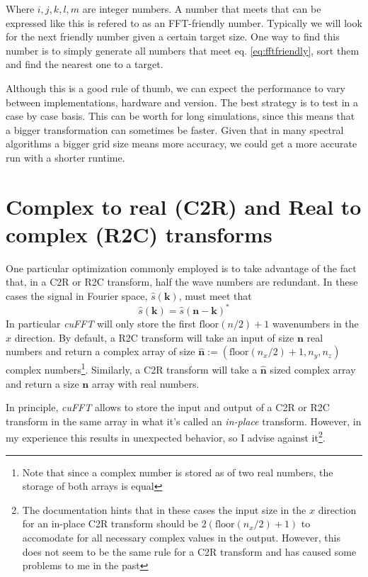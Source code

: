 \documentclass[ twoside,openright,titlepage,numbers=noenddot,%
headinclude,footinclude,cleardoublepage=empty,abstract=on,
BCOR=5mm,paper=a4,fontsize=11pt, dvipsnames
]{scrreprt}
\renewcommand{\vec}[1]{\bm{#1}}
\begin{document}
Where $i,j,k,l,m$ are integer numbers. A number that meets that can be expressed like this is refered to as an \gls{FFT}-friendly number.
Typically we will look for the next friendly number given a certain target size. One way to find this number is to simply generate all numbers that meet eq. \eqref{eq:fftfriendly}, sort them and find the nearest one to a target.

Although this is a good rule of thumb, we can expect the performance to vary between implementations, hardware and version. The best strategy is to test in a case by case basis. This can be worth for long simulations, since this means that a bigger transformation can sometimes be faster. Given that in many spectral algorithms a bigger grid size means more accuracy, we could get a more accurate run with a shorter runtime.


\section*{Complex to real (C2R) and Real to complex (R2C) transforms}

One particular optimization commonly employed is to take advantage of the fact that, in a C2R or R2C transform, half the wave numbers are redundant. In these cases the signal in Fourier space, $\hat{s}(\vec{k})$, must meet that
\begin{equation}
  \hat{s}(\vec{k}) = \hat{s}(\vec{n} - \vec{k})^*
\end{equation}
In particular \emph{cuFFT} will only store the first $\textrm{floor}(n/2)+1$ wavenumbers in the $x$ direction. By default, a R2C transform will take an input of size $\vec{n}$ real numbers and return a complex array of size $\hat{\vec{n}} := (\textrm{floor}(n_x/2)+1, n_y, n_z)$ complex numbers\footnote{Note that since a complex number is stored as of two real numbers, the storage of both arrays is equal}. Similarly, a C2R transform will take a $\hat{\vec{n}}$ sized complex array and return a size $\vec{n}$ array with real numbers.

In principle, \emph{cuFFT} allows to store the input and output of a C2R or R2C transform in the same array in what it's called an \emph{in-place} transform. However, in my experience this results in unexpected behavior, so I advise against it\footnote{The documentation hints that in these cases the input size in the $x$ direction for an in-place C2R transform should be $2(\textrm{floor}(n_x/2)+1)$ to accomodate for all necessary complex values in the output. However, this does not seem to be the same rule for a C2R transform and has caused some problems to me in the past}.
\end{document}
